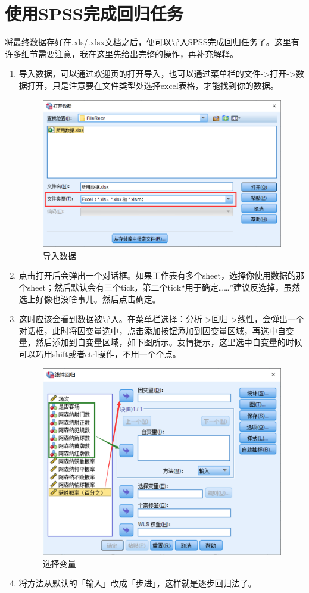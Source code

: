 \documentclass[10pt, a4paper]{article}
\begin{document}
\section{使用SPSS完成回归任务}
将最终数据存好在.xls/.xlsx文档之后，便可以导入SPSS完成回归任务了。这里有许多细节需要注意，我在这里先给出完整的操作，再补充解释。
\begin{enumerate}
    \item 导入数据，可以通过欢迎页的打开导入，也可以通过菜单栏的文件->打开->数据打开，只是注意要在文件类型处选择excel表格，才能找到你的数据。
    \begin{figure}[H]
        \centering
        \includegraphics[width=0.5\linewidth]{import.png}
        \caption{导入数据}
        \label{fig:import}
    \end{figure}
    \item 点击打开后会弹出一个对话框。如果工作表有多个sheet，选择你使用数据的那个sheet；然后默认会有三个tick，第二个tick“用于确定……”建议反选掉，虽然选上好像也没啥事儿。然后点击确定。
    \item 这时应该会看到数据被导入。在菜单栏选择：分析->回归->线性，会弹出一个对话框，此时将因变量选中，点击添加按钮添加到因变量区域，再选中自变量，然后添加到自变量区域，如下图所示。友情提示，这里选中自变量的时候可以巧用shift或者ctrl操作，不用一个个点。
    \begin{figure}[H]
        \centering
        \includegraphics[width=0.5\linewidth]{select.png}
        \caption{选择变量}
        \label{fig:select}
    \end{figure}
    \item 将方法从默认的「输入」改成「步进」，这样就是逐步回归法了。

\end{enumerate}
\end{document}
